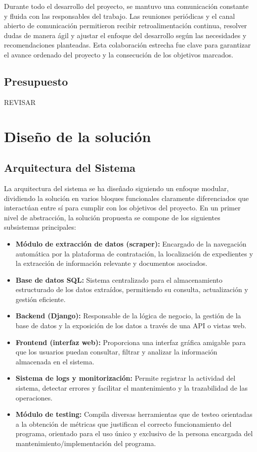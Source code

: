 \documentclass{article}
\begin{document}
Durante todo el desarrollo del proyecto, se mantuvo una comunicación constante y fluida con las responsables del trabajo. Las reuniones periódicas y el canal abierto de comunicación permitieron recibir retroalimentación continua, resolver dudas de manera ágil y ajustar el enfoque del desarrollo según las necesidades y recomendaciones planteadas. Esta colaboración estrecha fue clave para garantizar el avance ordenado del proyecto y la consecución de los objetivos marcados.

\subsection{Presupuesto} REVISAR

\section{Diseño de la solución}

\subsection{Arquitectura del Sistema}

La arquitectura del sistema se ha diseñado siguiendo un enfoque modular, dividiendo la solución en varios bloques funcionales claramente diferenciados que interactúan entre sí para cumplir con los objetivos del proyecto. En un primer nivel de abstracción, la solución propuesta se compone de los siguientes subsistemas principales:

\begin{itemize} 
\item \textbf{Módulo de extracción de datos (scraper):} Encargado de la navegación automática por la plataforma de contratación, la localización de expedientes y la extracción de información relevante y documentos asociados. \item \textbf{Base de datos SQL:} Sistema centralizado para el almacenamiento estructurado de los datos extraídos, permitiendo su consulta, actualización y gestión eficiente. 
\item \textbf{Backend (Django):} Responsable de la lógica de negocio, la gestión de la base de datos y la exposición de los datos a través de una API o vistas web. 
\item \textbf{Frontend (interfaz web):} Proporciona una interfaz gráfica amigable para que los usuarios puedan consultar, filtrar y analizar la información almacenada en el sistema. 
\item \textbf{Sistema de logs y monitorización:} Permite registrar la actividad del sistema, detectar errores y facilitar el mantenimiento y la trazabilidad de las operaciones. 
\item \textbf{Módulo de testing:} Compila diversas herramientas que de testeo orientadas a la obtención de métricas que justifican el correcto funcionamiento del programa, orientado para el uso único y exclusivo de la persona encargada del mantenimiento/implementación del programa. 
\end{itemize}
\end{document}
